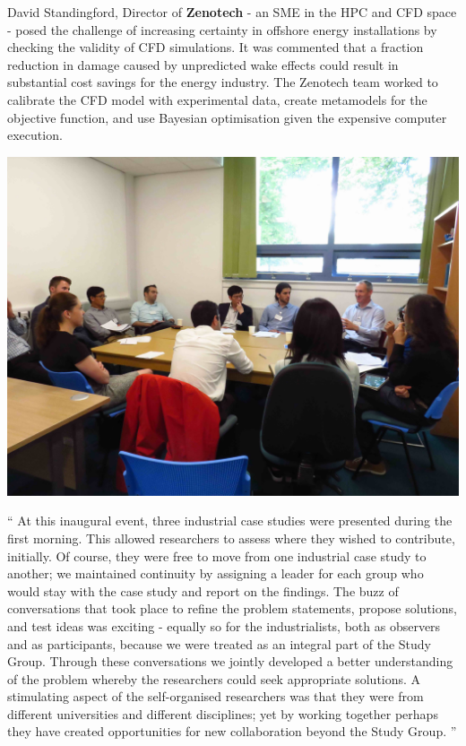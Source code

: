 \documentclass[11pt]{article}%
\begin{document}
\begin{minipage}[t]{.99\linewidth} %
\begin{multicols}{2}

David Standingford, Director of {\bf Zenotech} - an SME in the HPC and CFD space - posed the challenge of increasing certainty in offshore energy installations by checking the validity of CFD simulations. It was commented that a fraction reduction in damage caused by unpredicted wake effects could result in substantial cost savings for the energy industry. The Zenotech team worked to calibrate the CFD model with experimental data, create metamodels for the objective function, and use Bayesian optimisation given the expensive computer execution.

\vspace{10pt}
\begin{center}
\includegraphics[width=0.46 \textwidth]{studygroup/picts/IMG_1536_lr.jpg}
\end{center}

\vspace{10pt}
\begin{mdframed}[style=about,frametitle={}, leftmargin=20pt, rightmargin=20pt] %
\vspace{5pt}
    `` At this inaugural event, three industrial case studies were presented during the first morning. This allowed researchers to assess where they wished to contribute, initially. Of course, they were free to move from one industrial case study to another; we maintained continuity by assigning a leader for each group who would stay with the case study and report on the findings. The buzz of conversations that took place to refine the problem statements, propose solutions, and test ideas was exciting - equally so for the industrialists, both as observers and as participants, because we were treated as an integral part of the Study Group. Through these conversations we jointly developed a better understanding of the problem whereby the researchers could seek appropriate solutions. A stimulating aspect of the self-organised researchers was that they were from different universities and different disciplines; yet by working together perhaps they have created opportunities for new collaboration beyond the Study Group. '' 


\end{mdframed}
\end{multicols}
\end{minipage}
\end{document}
